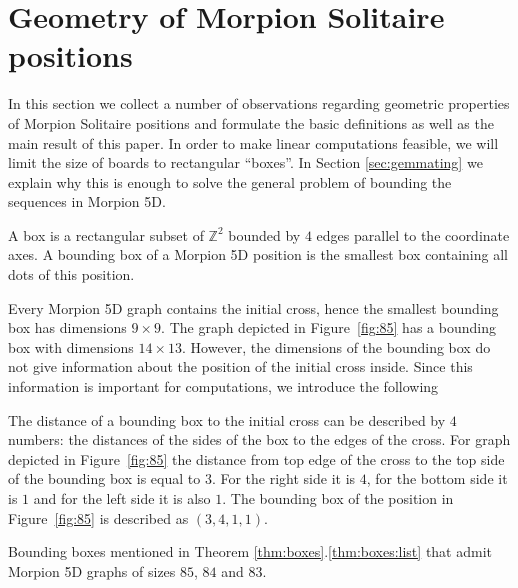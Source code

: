 
\section{Geometry of Morpion Solitaire positions}
\label{sec:geometry}

In this section we collect a number of observations regarding geometric properties of Morpion Solitaire positions and formulate the basic definitions as well as the main result of this paper. 
In order to make linear computations feasible, we will limit the size of boards to rectangular ``boxes''.  In Section \ref{sec:gemmating} we explain why this is enough to solve the general problem of bounding the sequences in Morpion 5D. 
\begin{definition}
A box is a rectangular subset of ${\mathbb Z}^2$ bounded by $4$ edges parallel to the coordinate axes. A bounding box of a Morpion 5D position is the smallest box
containing all dots of this position. %
\end{definition}

Every Morpion 5D graph contains the initial cross, hence the smallest bounding box has dimensions $9 \times 9$.
The graph depicted in Figure~\ref{fig:85} has a bounding box with dimensions $14 \times 13$.
However, the dimensions of the bounding box do not give information about the position of the initial cross inside. Since
this information is important for computations, we introduce the following %

\begin{notation*}
The distance of a bounding box to the initial cross can be described by $4$ numbers: the distances of the sides of the box to the edges of the cross. 
For graph depicted in Figure~\ref{fig:85} the distance from top edge of the cross to the top side of the bounding box is equal to $3$. For the right side it is $4$, for the bottom side it is $1$ and for the left side it is also $1$. 
The bounding box of the position in Figure~\ref{fig:85} is described as $(3,4,1,1)$.
\end{notation*}
  
\begin{table}[ht]
\centering
 

\caption{Bounding boxes mentioned in Theorem \ref{thm:boxes}.\ref{thm:boxes:list} that admit Morpion 5D graphs of sizes $85$, $84$ and $83$. }
\label{tbl:boundingboxes}
\end{table}

